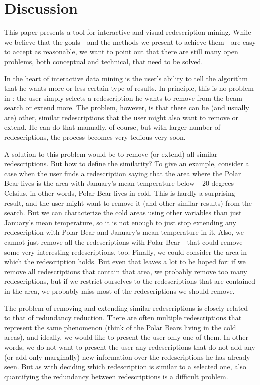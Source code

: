 \section{Discussion}

This paper presents a tool for interactive and visual redescription
mining. While we believe that the goals---and the methods we present
to achieve them---are easy to accept as reasonable, we want to point
out that there are still many open problems, both conceptual and
technical, that need to be solved. 

In the heart of interactive data mining is the user's ability to tell
the algorithm that he wants more or less certain type of results. In
principle, this is no problem in \Siren: the user simply selects a
redescription he wants to remove from the beam search or extend
more. The problem, however, is that there can be (and usually are)
other, similar redescriptions that the user might also want to remove
or extend. He can do that manually, of course, but with larger number
of redescriptions, the process becomes very tedious very soon.

A solution to this problem would be to remove (or extend) all similar
redescriptions. But how to define the similarity? To give an example,
consider a case when the user finds a redescription saying that the
area where the Polar Bear lives is the area with January's mean
temperature below $-20$ degrees Celsius, in other words, Polar Bear
lives in cold. This is hardly a surprising result, and the user might
want to remove it (and other similar results) from the search. But we
can characterize the cold areas using other variables than just
January's mean temperature, so it is not enough to just stop extending
any redescription with Polar Bear and January's mean temperature in
it. Also, we cannot just remove all the redescriptions with Polar
Bear---that could remove some very interesting redescriptions,
too. Finally, we could consider the area in which the redescription
holds. But even that leaves a lot to be hoped for: if we remove all
redescriptions that contain that area, we probably remove too many
redescriptions, but if we restrict ourselves to the redescriptions
that are contained in the area, we probably miss most of the
redescriptions we should remove.  

The problem of removing and extending similar redescriptions is
closely related to that of redundancy reduction. There are often
multiple redescriptions that represent the same phenomenon (think of
the Polar Bears living in the cold areas), and ideally, we would like
to present the user only one of them. In other words, we do not want
to present the user any redescriptions that do not add any (or add
only marginally) new information over the redescriptions he has
already seen. But as with deciding which redescription is similar to a
selected one, also quantifying the redundancy between redescriptions
is a difficult problem.

